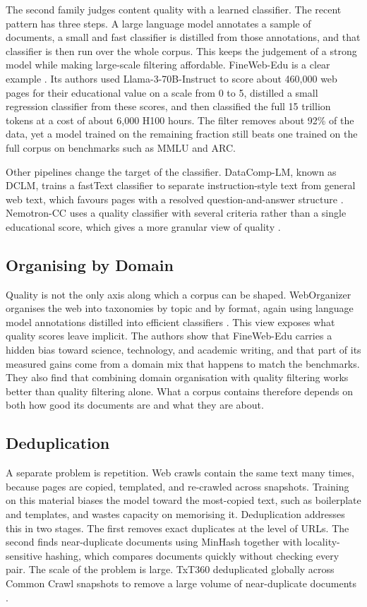 The second family judges content quality with a learned classifier. The recent pattern has
three steps. A large language model annotates a sample of documents, a small and fast
classifier is distilled from those annotations, and that classifier is then run over the
whole corpus. This keeps the judgement of a strong model while making large-scale filtering
affordable. FineWeb-Edu is a clear example \citep{penedo2024fineweb}. Its authors used
Llama-3-70B-Instruct to score about 460{,}000 web pages for their educational value on a
scale from 0 to 5, distilled a small regression classifier from these scores, and then
classified the full 15 trillion tokens at a cost of about 6{,}000 H100 hours. The filter
removes about 92\% of the data, yet a model trained on the remaining fraction still beats one
trained on the full corpus on benchmarks such as MMLU and ARC.

Other pipelines change the target of the classifier. DataComp-LM, known as DCLM, trains a
fastText classifier to separate instruction-style text from general web text, which favours
pages with a resolved question-and-answer structure \citep{li2024datacomp}. Nemotron-CC uses
a quality classifier with several criteria rather than a single educational score, which
gives a more granular view of quality \citep{nemotron_cc}.

\subsection{Organising by Domain}

Quality is not the only axis along which a corpus can be shaped. WebOrganizer organises the
web into taxonomies by topic and by format, again using language model annotations distilled
into efficient classifiers \citep{wettig2024weborganizer}. This view exposes what quality
scores leave implicit. The authors show that FineWeb-Edu carries a hidden bias toward
science, technology, and academic writing, and that part of its measured gains come from a
domain mix that happens to match the benchmarks. They also find that combining domain
organisation with quality filtering works better than quality filtering alone. What a corpus
contains therefore depends on both how good its documents are and what they are about.

\subsection{Deduplication}

A separate problem is repetition. Web crawls contain the same text many times, because pages
are copied, templated, and re-crawled across snapshots. Training on this material biases the
model toward the most-copied text, such as boilerplate and templates, and wastes capacity on
memorising it. Deduplication addresses this in two stages. The first removes exact duplicates
at the level of URLs. The second finds near-duplicate documents using MinHash together with
locality-sensitive hashing, which compares documents quickly without checking every pair.
The scale of the problem is large. TxT360 deduplicated globally across Common Crawl snapshots
to remove a large volume of near-duplicate documents \citep{tang2024txt360}.

